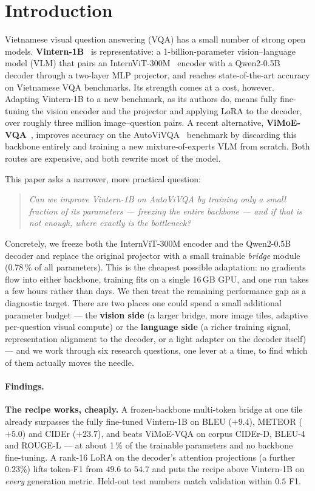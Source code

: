 \section{Introduction}
\label{sec:intro}

Vietnamese visual question answering (VQA) has a small number of strong open
models. \textbf{Vintern-1B}~\cite{vintern1b} is representative: a
1-billion-parameter vision--language model (VLM) that pairs an
InternViT-300M~\cite{internvl} encoder with a Qwen2-0.5B~\cite{qwen2} decoder
through a two-layer MLP projector, and reaches state-of-the-art accuracy on
Vietnamese VQA benchmarks. Its strength comes at a cost, however. Adapting
Vintern-1B to a new benchmark, as its authors do, means fully fine-tuning the
vision encoder and the projector and applying LoRA to the decoder, over roughly
three million image--question pairs. A recent alternative,
\textbf{ViMoE-VQA}~\cite{vimoevqa}, improves accuracy on the
AutoViVQA~\cite{autovivqa} benchmark by discarding this backbone entirely and
training a new mixture-of-experts VLM from scratch. Both routes are expensive,
and both rewrite most of the model.

This paper asks a narrower, more practical question:

\begin{quote}
\emph{Can we improve Vintern-1B on AutoViVQA by training only a small fraction of
its parameters --- freezing the entire backbone --- and if that is not enough,
where exactly is the bottleneck?}
\end{quote}

Concretely, we freeze both the InternViT-300M encoder and the Qwen2-0.5B decoder
and replace the original projector with a small trainable \emph{bridge} module
(0.78\,\% of all parameters). This is the cheapest possible adaptation: no
gradients flow into either backbone, training fits on a single 16\,GB GPU, and
one run takes a few hours rather than days. We then treat the remaining
performance gap as a diagnostic target. There are two places one could spend a
small additional parameter budget --- the \textbf{vision side} (a larger bridge,
more image tiles, adaptive per-question visual compute) or the \textbf{language
side} (a richer training signal, representation alignment to the decoder, or a
light adapter on the decoder itself) --- and we work through six research
questions, one lever at a time, to find which of them actually moves the needle.

\paragraph{Findings.}
\textbf{The recipe works, cheaply.} A frozen-backbone multi-token bridge at one
tile already surpasses the fully fine-tuned Vintern-1B on BLEU ($+9.4$), METEOR
($+5.0$) and CIDEr ($+23.7$), and beats ViMoE-VQA on corpus CIDEr-D, BLEU-4 and
ROUGE-L --- at about 1\,\% of the trainable parameters and no backbone
fine-tuning. A rank-16 LoRA on the decoder's attention projections (a further
$0.23\%$) lifts token-F1 from $49.6$ to $54.7$ and puts the recipe above
Vintern-1B on \emph{every} generation metric. Held-out test numbers match
validation within $0.5$ F1.

